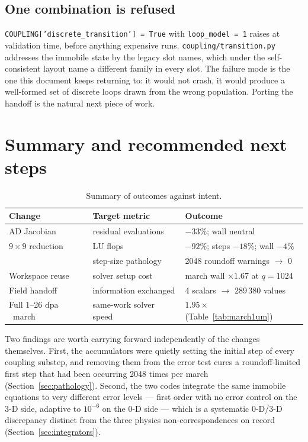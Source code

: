 \documentclass[11pt,a4paper]{article}
\newcommand{\code}[1]{\texttt{\small #1}}
\newcommand{\dpa}{\ensuremath{\mathrm{dpa}}}
\begin{document}
\subsection{One combination is refused}

\code{COUPLING['discrete\_transition'] = True} with \code{loop\_model = 1}
raises at validation time, before anything expensive runs.
\code{coupling/transition.py} addresses the immobile state by the legacy slot
names, which under the self-consistent layout name a different family in every
slot. The failure mode is the one this document keeps returning to: it would not
crash, it would produce a well-formed set of discrete loops drawn from the wrong
population. Porting the handoff is the natural next piece of work.

\section{Summary and recommended next steps}

\begin{table}[htb]
\centering
\caption{Summary of outcomes against intent.}
\begin{tabular}{lll}
\toprule
Change & Target metric & Outcome \\
\midrule
AD Jacobian        & residual evaluations & $-33\%$; wall neutral \\
$9\times9$ reduction & LU flops           & $-92\%$; steps $-18\%$; wall $-4\%$ \\
                   & step-size pathology  & 2048 roundoff warnings $\to$ 0 \\
Workspace reuse    & solver setup cost    & march wall $\times1.67$ at $q=1024$ \\
Field handoff      & information exchanged & 4 scalars $\to$ 289\,380 values \\
Full 1--26 \dpa\ march & same-work solver speed & $1.95\times$ (Table~\ref{tab:march1um}) \\
\bottomrule
\end{tabular}
\end{table}

\noindent
Two findings are worth carrying forward independently of the changes
themselves. First, the accumulators were quietly setting the initial step of
every coupling substep, and removing them from the error test cures a
roundoff-limited first step that had been occurring 2048 times per march
(Section~\ref{sec:pathology}). Second, the two codes integrate the same immobile
equations to very different error levels --- first order with no error control
on the 3-D side, adaptive to $10^{-6}$ on the 0-D side --- which is a systematic
0-D/3-D discrepancy distinct from the three physics non-correspondences on
record (Section~\ref{sec:integrators}).
\end{document}
